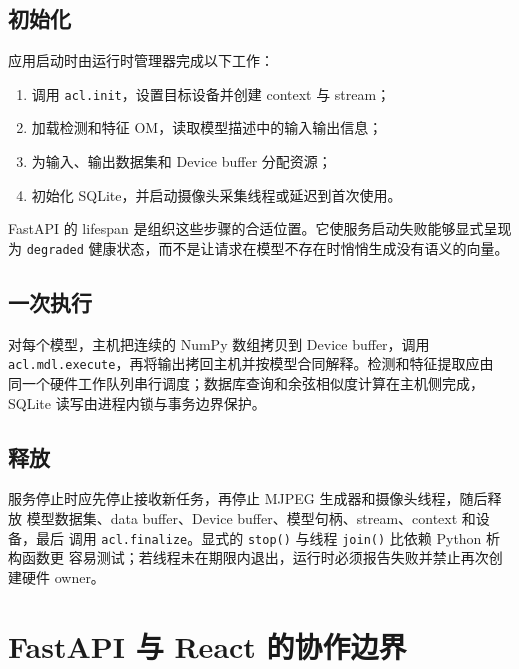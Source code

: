 \subsection{初始化}\label{ux521dux59cbux5316}

应用启动时由运行时管理器完成以下工作：

\begin{enumerate}
\def\labelenumi{\arabic{enumi}.}
\tightlist
\item
  调用 \passthrough{\lstinline!acl.init!}，设置目标设备并创建 context 与
  stream；
\item
  加载检测和特征 OM，读取模型描述中的输入输出信息；
\item
  为输入、输出数据集和 Device buffer 分配资源；
\item
  初始化 SQLite，并启动摄像头采集线程或延迟到首次使用。
\end{enumerate}

FastAPI 的 lifespan
是组织这些步骤的合适位置。它使服务启动失败能够显式呈现 为
\passthrough{\lstinline!degraded!}
健康状态，而不是让请求在模型不存在时悄悄生成没有语义的向量。

\subsection{一次执行}\label{ux4e00ux6b21ux6267ux884c}

对每个模型，主机把连续的 NumPy 数组拷贝到 Device buffer，调用
\passthrough{\lstinline!acl.mdl.execute!}，再将输出拷回主机并按模型合同解释。检测和特征提取应由
同一个硬件工作队列串行调度；数据库查询和余弦相似度计算在主机侧完成，SQLite
读写由进程内锁与事务边界保护。

\subsection{释放}\label{ux91caux653e}

服务停止时应先停止接收新任务，再停止 MJPEG 生成器和摄像头线程，随后释放
模型数据集、data buffer、Device buffer、模型句柄、stream、context
和设备，最后 调用 \passthrough{\lstinline!acl.finalize!}。显式的
\passthrough{\lstinline!stop()!} 与线程 \passthrough{\lstinline!join()!}
比依赖 Python 析构函数更
容易测试；若线程未在期限内退出，运行时必须报告失败并禁止再次创建硬件
owner。

\section{FastAPI 与 React
的协作边界}\label{fastapi-ux4e0e-react-ux7684ux534fux4f5cux8fb9ux754c}

